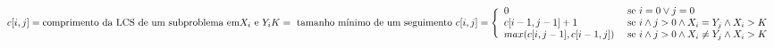\begin{math}
    c[i,j] = \textnormal{comprimento da LCS de um subproblema em} 
    X_i \textnormal{ e } Y_i \\
    K = \textnormal{ tamanho mínimo de um seguimento } \\ \\
    c[i,j] = \Bigg\{
        \begin{array}{l l}
            0 & \textnormal{ se } i = 0 \vee j = 0 \\
            c[i-1,j-1] + 1 & \textnormal{ se } i \wedge j > 0 \wedge
            X_i = Y_j \wedge X_i > K \\
            max(c[i,j-1], c[i-1,j]) & \textnormal{ se } i \wedge 
            j > 0 \wedge X_i \ne Y_j \wedge X_i > K 
        \end{array}
\end{math}



